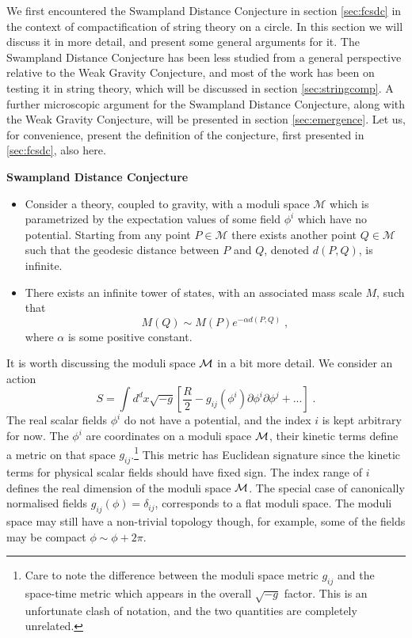 \documentclass[11pt,a4paper]{article}
\numberwithin{equation}{section}
\numberwithin{table}{section}\setlength{\multlinegap}{25pt}
\newcommand{\cM}{\mathcal M}
\newcommand{\be}{\begin{equation}}
\newcommand{\ee}{\end{equation}}
\begin{document}
We first encountered the Swampland Distance Conjecture in section \ref{sec:fcsdc} in the context of compactification of string theory on a circle. In this section we will discuss it in more detail, and present some general arguments for it. The Swampland Distance Conjecture has been less studied from a general perspective relative to the Weak Gravity Conjecture, and most of the work has been on testing it in string theory, which will be discussed in section \ref{sec:stringcomp}. A further microscopic argument for the Swampland Distance Conjecture, along with the Weak Gravity Conjecture, will be presented in section \ref{sec:emergence}. Let us, for convenience, present the definition of the conjecture, first presented in \ref{sec:fcsdc}, also here. 

\begin{tcolorbox}
{\bf Swampland Distance Conjecture } \;\cite{Ooguri:2006in}
{\it 
\begin{itemize}
\item Consider a theory, coupled to gravity, with a moduli space $\cM$ which is parametrized by the expectation values of some field $\phi^i$ which have no potential. Starting from any point $P \in \cM$ there exists another point $Q \in \cM$ such that the geodesic distance between $P$ and $Q$, denoted $d\left(P,Q\right)$, is infinite. 
\item There exists an infinite tower of states, with an associated mass scale $M$, such that 
\be
\label{sdc}
M\left(Q\right) \sim M\left(P\right) e^{-\alpha d\left(P,Q\right) } \;,
\ee
where $\alpha$ is some positive constant.
\end{itemize}
}
\end{tcolorbox}

It is worth discussing the moduli space ${\cal M}$ in a bit more detail. We consider an action
\be
S = \int d^d x \sqrt{-g} \left[\frac{R}{2} - g_{ij}\left( \phi^i \right) \partial \phi^i \partial \phi^j + ... \right] \;.
\ee
The real scalar fields $\phi^i$ do not have a potential, and the index $i$ is kept arbitrary for now. The $\phi^i$ are coordinates on a moduli space ${\cal M}$, their kinetic terms define a metric on that space $g_{ij}$.\footnote{Care to note the difference between the moduli space metric $g_{ij}$ and the space-time metric which appears in the overall $\sqrt{-g}$ factor. This is an unfortunate clash of notation, and the two quantities are completely unrelated.} This metric has Euclidean signature since the kinetic terms for physical scalar fields should have fixed sign. The index range of $i$ defines the real dimension of the moduli space ${\cal M}$. The special case of canonically normalised fields $g_{ij}\left(\phi\right) = \delta_{ij}$, corresponds to a flat moduli space. The moduli space may still have a non-trivial topology though, for example, some of the fields may be compact $\phi \sim \phi + 2 \pi$.
\end{document}
